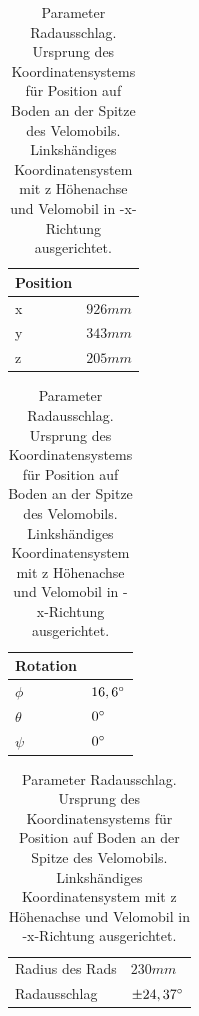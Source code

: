\begin{table}[h]
	\begin{tabularx}{.5\textwidth}{ll}\hline
		
		Position & \\
		\hline
		x &	$926mm$ \\
		y &	$343mm$ \\
		z &	$205mm$	\\
	\end{tabularx}
	\begin{tabularx}{.5\textwidth}{ll}\hline
		Rotation & \\ \hline
		$\phi$ & $16,6\degree$ \\
		$\theta$ & $0\degree$ \\
		$\psi$ & $0\degree$ \\
	\end{tabularx}
	\begin{tabularx}{.5\linewidth}{ll}
		Radius des Rads & $230mm$ \\
		Radausschlag & $\pm24,37\degree$\\
		
	\end{tabularx}

\label{tab:wheel_params}
\caption{Parameter Radausschlag. Ursprung des Koordinatensystems für Position auf Boden an der Spitze des Velomobils. Linkshändiges Koordinatensystem mit z Höhenachse und Velomobil in -x-Richtung ausgerichtet.}
\end{table}

